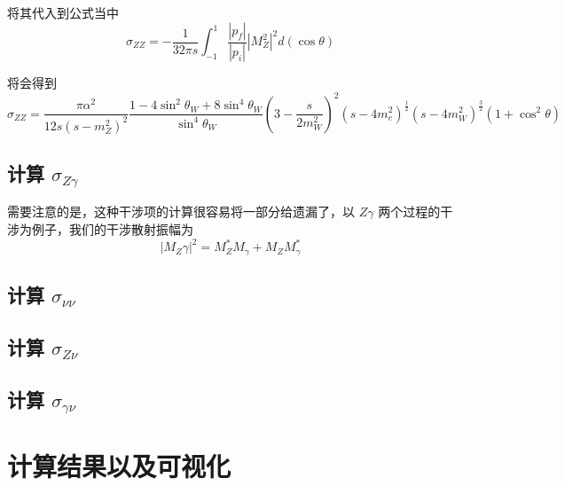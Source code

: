 \documentclass{article}
\begin{document}
将其代入到公式当中
\begin{equation*}
    \sigma_{ZZ} = -\frac{1}{32 \pi s} \int_{-1}^{1} \frac{|p_f|}{|p_i|} \left|M_Z^2\right|^2 d(\cos{\theta})
\end{equation*}

将会得到
\begin{equation}
    \sigma_{ZZ} = \frac{\pi \alpha^2}{12s\left(s - m_Z^2\right)^2}\frac{1 - 4\sin^2{\theta_W} + 8\sin^4{\theta_W}}{\sin^4{\theta_W}}\left(3 - \frac{s}{2m_W^2}\right)^2 \left(s - 4m_e^2 \right)^{\frac{1}{2}}\left(s - 4m_W^2\right)^{\frac{3}{2}} \left(1 + \cos^2{\theta}\right)
\end{equation}






\subsection{计算 $\sigma_{Z\gamma}$}
需要注意的是，这种干涉项的计算很容易将一部分给遗漏了，以 $Z \gamma$ 两个过程的干涉为例子，我们的干涉散射振幅为
\begin{equation*}
    \left|M_Z\gamma\right|^2 = M_Z^* M_\gamma + M_Z M_\gamma^*
\end{equation*}





\subsection{计算 $\sigma_{\nu \nu}$}




\subsection{计算 $\sigma_{Z\nu}$}





\subsection{计算 $\sigma_{\gamma \nu}$}






\section{计算结果以及可视化}
\end{document}
